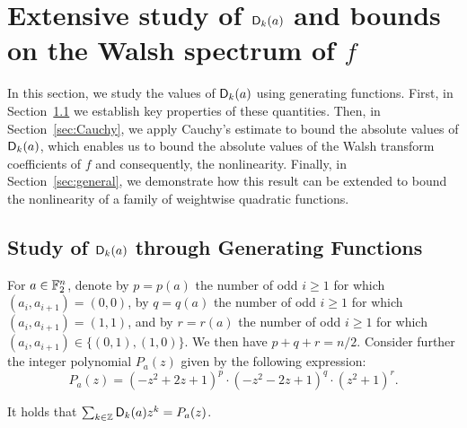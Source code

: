 \documentclass[11pt]{llncs}
\begin{document}









\section{Extensive study of $\Dnka nka$ and bounds on the Walsh spectrum of $f$}\label{sec:dnk}

In this section, we study the values of $\Dnka nka$ using generating functions. First, in Section~\ref{sec:genfunc} we establish key properties of these quantities. Then, in Section~\ref{sec:Cauchy}, we apply Cauchy's estimate to bound the absolute values of $\Dnka nka$, which enables us to bound the absolute values of the Walsh transform coefficients of $f$ and consequently, the nonlinearity.
Finally, in Section~\ref{sec:general}, we demonstrate how this result can be extended to bound the nonlinearity of a family of weightwise quadratic functions.











\subsection{Study of $\Dnka nka$ through Generating Functions}\label{sec:genfunc}

\begin{definition}\label{defi:P_a}
    For $a\in\F_2^n$, denote by $p=p(a)$ the number of odd $i\geq 1$ for which $(a_i,a_{i+1})=(0,0)$, by $q=q(a)$ the number of odd $i\geq 1$ for which $(a_i,a_{i+1})=(1,1)$, and by $r=r(a)$ the number of odd $i\geq 1$ for which $(a_i,a_{i+1})\in\{(0,1),(1,0)\}$. We then have $p+q+r=n/2$. Consider further the integer polynomial $P_a(z)$ given by the following expression:
    \[
    P_a(z)=(-z^2+2z+1)^{p}\cdot(-z^2-2z+1)^{q}\cdot(z^2+1)^{r}.
    \]
\end{definition}


\begin{proposition}\label{proposition:generating_fct}
	It holds that $\sum_{k\in\Z}\Dnka nka z^k= P_a(z)$.
\end{proposition}
\end{document}

